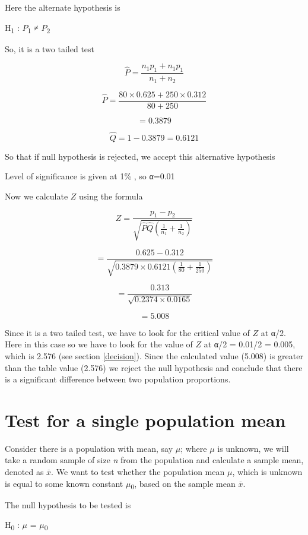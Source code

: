 \documentclass[
]{book}
\begin{document}
Here the alternate hypothesis is

H\textsubscript{1} : \(P\)\textsubscript{1} ≠ \(P\)\textsubscript{2}

So, it is a two tailed test

\[\widehat{P} = \frac{n_{1}p_{1} + n_{1}p_{1}}{n_{1} + n_{2}}\]

\[\widehat{P} = \frac{80 \times 0.625 + 250 \times 0.312}{80 + 250}\]

\[= 0.3879\]

\[\widehat{Q} = 1 - 0.3879 = 0.6121\]

So that if null hypothesis is rejected, we accept this alternative hypothesis

Level of significance is given at 1\% , so α=0.01

Now we calculate \(Z\) using the formula

\[Z = \frac{p_{1} - p_{2}}{\sqrt{\widehat{P}\widehat{Q}\left( \frac{1}{n_{1}} + \frac{1}{n_{2}} \right)}}\]

\[= \frac{0.625 - 0.312}{\sqrt{0.3879 \times 0.6121\left( \frac{1}{80} + \frac{1}{250} \right)}}\]

\[= \frac{0.313}{\sqrt{0.2374 \times 0.0165}}\]

\[= 5.008\]

Since it is a two tailed test, we have to look for the critical value of \(Z\) at α/2. Here in this case so we have to look for the value of \(Z\) at α/2 = 0.01/2 = 0.005, which is 2.576 (see section \ref{decision}). Since the
calculated value (5.008) is greater than the table value (2.576) we reject the null hypothesis and conclude that there is a significant difference between two population proportions.

\hypertarget{test-for-a-single-population-mean}{%
\section{Test for a single population mean}\label{test-for-a-single-population-mean}}

Consider there is a population with mean, say \(μ\); where \(μ\) is unknown, we will take a random sample of size \emph{n} from the population and calculate a sample mean, denoted as \(\overline{x}\). We want to test whether the population mean \(μ\), which is unknown is equal to some known constant \(μ\)\textsubscript{0}, based on the sample mean \(\overline{x}\).

The null hypothesis to be tested is

H\textsubscript{0} : \(μ\) = \(μ\)\textsubscript{0}
\end{document}
